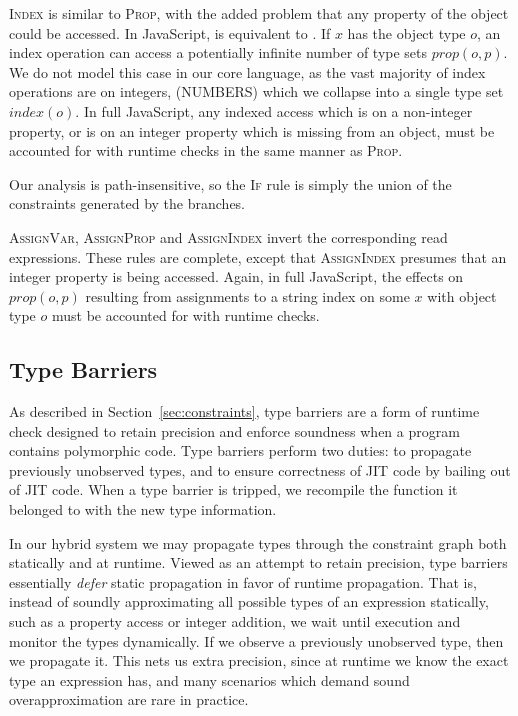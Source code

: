 \textsc{Index} is similar to \textsc{Prop}, with the added problem that any
property of the object could be accessed.  In JavaScript,  is
equivalent to . If $x$ has the object type $o$, an index operation
can access a potentially infinite number of type sets $\mathit{prop}(o,p)$. We
do not model this case in our core language, as the vast majority of index
operations are on integers, (NUMBERS) which we collapse into a single type set
$\mathit{index}(o)$.  In full JavaScript, any indexed access which is on a
non-integer property, or is on an integer property which is missing from an
object, must be accounted for with runtime checks in the same manner as
\textsc{Prop}.

Our analysis is path-insensitive, so the \textsc{If} rule is simply the union
of the constraints generated by the branches.

\textsc{AssignVar}, \textsc{AssignProp} and \textsc{AssignIndex} invert the
corresponding read expressions.  These rules are complete, except that
\textsc{AssignIndex} presumes that an integer property is being accessed.
Again, in full JavaScript, the effects on $\mathit{prop}(o,p)$ resulting from
assignments to a string index  on some $x$ with object type $o$
must be accounted for with runtime checks.



\subsection{Type Barriers}
\label{sec:barriers}

As described in Section~\ref{sec:constraints}, type barriers are a form of
runtime check designed to retain precision and enforce soundness when a
program contains polymorphic code. Type barriers perform two duties: to
propagate previously unobserved types, and to ensure correctness of JIT code
by bailing out of JIT code. When a type barrier is tripped, we recompile the
function it belonged to with the new type information.

In our hybrid system we may propagate types through the constraint graph both
statically and at runtime. Viewed as an attempt to retain precision, type
barriers essentially \emph{defer} static propagation in favor of runtime
propagation. That is, instead of soundly approximating all possible types of
an expression statically, such as a property access or integer addition, we
wait until execution and monitor the types dynamically. If we observe a
previously unobserved type, then we propagate it. This nets us extra
precision, since at runtime we know the exact type an expression has, and many
scenarios which demand sound overapproximation are rare in practice.

